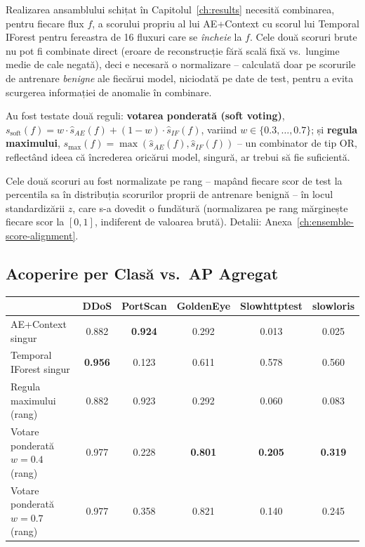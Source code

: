 Realizarea ansamblului schițat în Capitolul~\ref{ch:results} necesită combinarea, pentru fiecare flux $f$, a scorului propriu al lui AE+Context cu scorul lui Temporal IForest pentru fereastra de 16 fluxuri care se \emph{încheie} la $f$. Cele două scoruri brute nu pot fi combinate direct (eroare de reconstrucție fără scală fixă vs.\ lungime medie de cale negată), deci e necesară o normalizare -- calculată doar pe scorurile de antrenare \emph{benigne} ale fiecărui model, niciodată pe date de test, pentru a evita scurgerea informației de anomalie în combinare.

Au fost testate două reguli: \textbf{votarea ponderată (soft voting)}, $s_{\text{soft}}(f) = w \cdot \hat{s}_{AE}(f) + (1-w) \cdot \hat{s}_{IF}(f)$, variind $w \in \{0.3, \dots, 0.7\}$; și \textbf{regula maximului}, $s_{\text{max}}(f) = \max(\hat{s}_{AE}(f), \hat{s}_{IF}(f))$ -- un combinator de tip OR, reflectând ideea că încrederea oricărui model, singură, ar trebui să fie suficientă.

Cele două scoruri au fost normalizate pe rang -- mapând fiecare scor de test la percentila sa în distribuția scorurilor proprii de antrenare benignă -- în locul standardizării $z$, care s-a dovedit o fundătură (normalizarea pe rang mărginește fiecare scor la $[0,1]$, indiferent de valoarea brută). Detalii: Anexa~\ref{ch:ensemble-score-alignment}.

\subsection{Acoperire per Clasă vs.\ AP Agregat}
\label{sec:explain-ensemble-results}

\begin{center}
\begin{tabular}{@{}lccccc@{}}
\toprule
 & DDoS & PortScan & GoldenEye & Slowhttptest & slowloris \\
\midrule
AE+Context singur         & 0.882 & \textbf{0.924} & 0.292 & 0.013 & 0.025 \\
Temporal IForest singur   & \textbf{0.956} & 0.123 & 0.611 & 0.578 & 0.560 \\
Regula maximului (rang)   & 0.882 & 0.923 & 0.292 & 0.060 & 0.083 \\
Votare ponderată $w=0.4$ (rang) & 0.977 & 0.228 & \textbf{0.801} & \textbf{0.205} & \textbf{0.319} \\
Votare ponderată $w=0.7$ (rang) & 0.977 & 0.358 & 0.821 & 0.140 & 0.245 \\
\bottomrule
\end{tabular}
\end{center}

